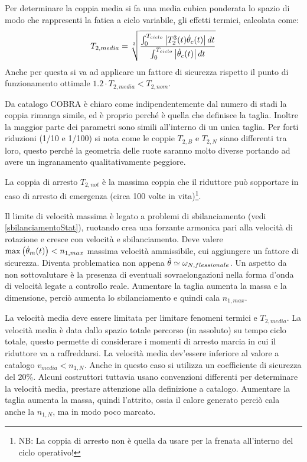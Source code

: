 Per determinare la coppia media si fa una media cubica ponderata lo spazio di modo che rappresenti la fatica a ciclo variabile, gli effetti termici, calcolata come:
\[
T_{2,media} = \sqrt[3]{\frac{\int^{T_{ciclo}}_0 \left|T_2^3(t)\dot{\theta}_c(t)\right|dt}{\int^{T_{ciclo}}_0 \left|\dot{\theta}_c(t)\right|dt}}
\]
Anche per questa si va ad applicare un fattore di sicurezza rispetto il punto di funzionamento ottimale $1.2\cdot T_{2,media}<T_{2,nom}$.

Da catalogo COBRA è chiaro come indipendentemente dal numero di stadi la coppia rimanga simile, ed è proprio perché è quella che definisce la taglia. 
Inoltre la maggior parte dei parametri sono simili all'interno di un unica taglia.
Per forti riduzioni (1/10 e 1/100) si nota come le coppie $T_{2,B}$ e $T_{2,N}$ siano differenti tra loro, questo perché la geometria delle ruote saranno molto diverse portando ad avere un ingranamento qualitativamente peggiore.

La coppia di arresto $T_{2,not}$ è la massima coppia che il riduttore può sopportare in caso di arresto di emergenza (circa 100 volte in vita)\footnote{NB: La coppia di arresto non è quella da usare per la frenata all'interno del ciclo operativo!}.

Il limite di velocità massima è legato a problemi di sbilanciamento (vedi \ref{sbilanciamentoStat}), ruotando crea una forzante armonica pari alla velocità di rotazione e cresce con velocità e sbilanciamento. 
Deve valere $\operatorname{max}\left(\dot{\theta}_m(t)\right)< n_{1,max}$ massima velocità ammissibile, cui aggiungere un fattore di sicurezza.
Diventa problematica non appena $\dot{\theta} \simeq \omega_{N, flessionale}$.
Un aspetto da non sottovalutare è la presenza di eventuali sovraelongazioni nella forma d'onda di velocità legate a controllo reale.
Aumentare la taglia aumenta la massa e la dimensione, perciò aumenta lo sbilanciamento e quindi cala $n_{1,max}$.

La velocità media deve essere limitata per limitare fenomeni termici e $T_{2,media}$. La velocità media è data dallo spazio totale percorso (in assoluto) su tempo ciclo totale, questo permette di considerare i momenti di arresto marcia in cui il riduttore va a raffreddarsi. La velocità media dev'essere inferiore al valore a catalogo $v_{media} < n_{1,N}$. Anche in questo caso si utilizza un coefficiente di sicurezza del $20\%$. Alcuni costruttori tuttavia usano convenzioni differenti per determinare la velocità media, prestare attenzione alla definizione a catalogo.
Aumentare la taglia aumenta la massa, quindi l'attrito, ossia il calore generato perciò cala anche la $n_{1,N}$, ma in modo poco marcato.

